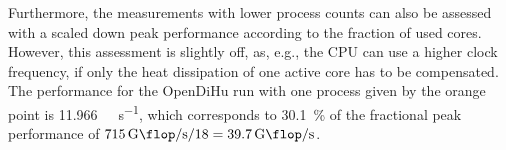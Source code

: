 Furthermore, the measurements with lower process counts can also be assessed with a scaled down peak performance according to the fraction of used cores. However, this assessment is slightly off, as, e.g., the CPU can use a higher clock frequency, if only the heat dissipation of one active core has to be compensated. The performance for the OpenDiHu run with one process given by the orange point is \SI{11.966}{\giga\flop\per\second}, which corresponds to \SI{30.1}{\percent} of the fractional peak performance of $\SI{715}{\giga\flop\per\second}/18 = \SI{39.7}{\giga\flop\per\second}$.

% 

